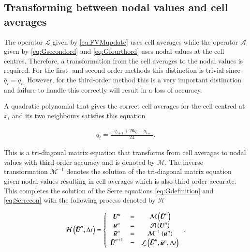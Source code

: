 \documentclass[SingleSpace,12pt,Proceedings]{Serre_ASCE}
\begin{document}
\subsection{Transforming between nodal values and cell averages} %
The operator $\mathcal{L}$ given by \eqref{eq:FVMupdate} uses cell averages while the operator $\mathcal{A}$ given by \eqref{eq:Gsecondord} and \eqref{eq:Gfourthord} uses nodal values at the cell centres. Therefore, a transformation from the cell averages to the nodal values is required. For the first- and second-order methods this distinction is trivial since $\bar{q}_i = q_i$. However, for the third-order method this is a very important distinction and failure to handle this correctly will result in a loss of accuracy. 

A quadratic polynomial that gives the correct cell averages for the cell centred at $x_i$ and its two neighbours satisfies this equation
\begin{linenomath*}
\begin{gather*} %
q_i = \frac{- \bar{q}_{i+1} + 26\bar{q}_{i} - \bar{q}_{i-1}}{24}.
\end{gather*}
\end{linenomath*}
This is a tri-diagonal matrix equation that transforms from cell averages to nodal values with third-order accuracy and is denoted by $\mathcal{M}$. The inverse transformation $\mathcal{M}^{-1}$ denotes the solution of the tri-diagonal matrix equation given nodal values resulting in cell averages which is also third-order accurate. This completes the solution of the Serre equations \eqref{eq:Gdefinition} and \eqref{eq:Serrecon} with the following process denoted by $\mathcal{H}$
\begin{linenomath*}
\begin{gather*}
\mathcal{H}\left(\boldsymbol{\bar{U}}^n,\Delta t \right) = \left\lbrace 
\begin{array}{c c c} 
	\boldsymbol{U}^n &=& \mathcal{M}\left(\boldsymbol{\bar{U}}^n\right) \\
	\boldsymbol{u}^n &=& \mathcal{A}\left(\boldsymbol{U}^n\right) \\
	\boldsymbol{\bar{u}}^n &=&  \mathcal{M}^{-1}\left(\boldsymbol{u}^n\right) \\
	\boldsymbol{\bar{U}}^{n+1} &=& \mathcal{L}\left(\boldsymbol{\bar{U}}^{n},\boldsymbol{\bar{u}}^n,\Delta t\right)							
\end{array} \right. .
\end{gather*}
\end{linenomath*}
\end{document}
